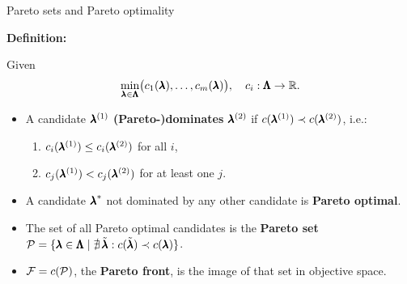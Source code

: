 \documentclass[11pt,compress,t,notes=noshow,xcolor=table]{beamer}
\begin{document}
\begin{vbframe}{Pareto sets and Pareto optimality}

\textbf{Definition:}

Given 
\[
\min_{\pmb{\lambda} \in \pmb{\Lambda}} 
   \bigl(c_1(\pmb{\lambda}), \dots, c_m(\pmb{\lambda})\bigr), 
\quad c_i: \pmb{\Lambda} \to \mathbb{R}.
\]

\begin{itemize}
  \item A candidate \(\pmb{\lambda}^{(1)}\) \textbf{(Pareto-)dominates} \(\pmb{\lambda}^{(2)}\) 
        if \(c(\pmb{\lambda}^{(1)}) \prec c(\pmb{\lambda}^{(2)})\), i.e.:
    \begin{enumerate}
      \item \(c_i(\pmb{\lambda}^{(1)}) \le c_i(\pmb{\lambda}^{(2)})\) for all \(i\),
      \item \(c_j(\pmb{\lambda}^{(1)}) < c_j(\pmb{\lambda}^{(2)})\) for at least one \(j\).
    \end{enumerate}
    \item A candidate \({\pmb{\lambda}}^*\) not dominated by any other candidate is 
          \textbf{Pareto optimal}.
    \item The set of all Pareto optimal candidates is the \textbf{Pareto set} 
          \(\mathcal{P} = \{\pmb{\lambda} \in \pmb{\Lambda} \mid \nexists \,\tilde{\pmb{\lambda}} :
               c(\tilde{\pmb{\lambda}}) \prec c(\pmb{\lambda})\}\).
    \item \(\mathcal{F} = c(\mathcal{P})\), the \textbf{Pareto front}, 
          is the image of that set in objective space.
\end{itemize}

\end{vbframe}
\end{document}
